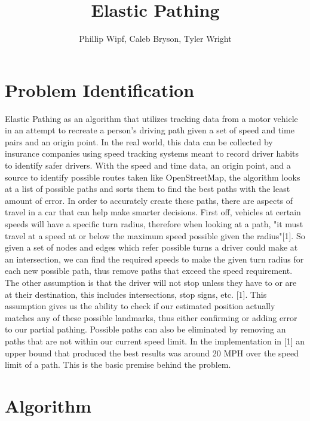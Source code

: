 \documentclass[11pt]{article}
\title{Elastic Pathing}
\author{Phillip Wipf, Caleb Bryson, Tyler Wright}
\begin{document}
\maketitle
\section{Problem Identification}

Elastic Pathing as an algorithm that utilizes tracking data from a motor vehicle in an attempt to recreate a person's driving path given a set of speed and time pairs and an origin point. In the real world, this data can be collected by insurance companies using speed tracking systems meant to record driver habits to identify safer drivers. With the speed and time data, an origin point, and a source to identify possible routes taken like OpenStreetMap, the algorithm looks at a list of possible paths and sorts them to find the best paths with the least amount of error. In order to accurately create these paths, there are aspects of travel in a car that can help make smarter decisions. First off, vehicles at certain speeds will have a specific turn radius, therefore when looking at a path, "it must travel at a speed at or below the maximum speed possible given the radius"[1]. So given a set of nodes and edges which refer possible turns a driver could make at an intersection, we can find the required speeds to make the given turn radius for each new possible path, thus remove paths that exceed the speed requirement.  The other assumption is that the driver will not stop unless they have to or are at their destination, this includes intersections, stop signs, etc. [1]. This assumption gives us the ability to check if our estimated position actually matches any of these possible landmarks, thus either confirming or adding error to our partial pathing. Possible paths can also be eliminated by removing an paths that are not within our current speed limit. In the implementation in [1] an upper bound that produced the best results was around 20 MPH over the speed limit of a path. This is the basic premise behind the problem.


\section{Algorithm}
\end{document}
